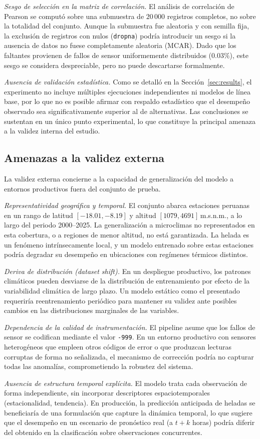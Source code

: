 \emph{Sesgo de selección en la matriz de correlación.} El análisis de correlación
de Pearson se computó sobre una submuestra de $20\,000$ registros completos, no
sobre la totalidad del conjunto. Aunque la submuestra fue aleatoria y con semilla
fija, la exclusión de registros con nulos (\texttt{dropna}) podría introducir un
sesgo si la ausencia de datos no fuese completamente aleatoria (MCAR). Dado que
los faltantes provienen de fallos de sensor uniformemente distribuidos
($0.03\%$), este sesgo se considera despreciable, pero no puede descartarse
formalmente.

\emph{Ausencia de validación estadística.} Como se detalló en la
Sección~\ref{sec:results}, el experimento no incluye múltiples ejecuciones
independientes ni modelos de línea base, por lo que no es posible afirmar con
respaldo estadístico que el desempeño observado sea significativamente superior al
de alternativas. Las conclusiones se sustentan en un único punto experimental, lo
que constituye la principal amenaza a la validez interna del estudio.

\subsection{Amenazas a la validez externa}
La validez externa concierne a la capacidad de generalización del modelo a
entornos productivos fuera del conjunto de prueba.

\emph{Representatividad geográfica y temporal.} El conjunto abarca estaciones
peruanas en un rango de latitud $[-18.01, -8.19]$ y altitud
$[1079, 4691]$\,m.s.n.m., a lo largo del periodo 2000--2025. La generalización a
microclimas no representados en esta cobertura, o a regiones de menor altitud, no
está garantizada. La helada es un fenómeno intrínsecamente local, y un modelo
entrenado sobre estas estaciones podría degradar su desempeño en ubicaciones con
regímenes térmicos distintos.

\emph{Deriva de distribución (\emph{dataset shift}).} En un despliegue productivo,
los patrones climáticos pueden desviarse de la distribución de entrenamiento por
efecto de la variabilidad climática de largo plazo. Un modelo estático como el
presentado requeriría reentrenamiento periódico para mantener su validez ante
posibles cambios en las distribuciones marginales de las variables.

\emph{Dependencia de la calidad de instrumentación.} El pipeline asume que los
fallos de sensor se codifican mediante el valor \texttt{-999}. En un entorno
productivo con sensores heterogéneos que empleen otros códigos de error o que
produzcan lecturas corruptas de forma no señalizada, el mecanismo de corrección
podría no capturar todas las anomalías, comprometiendo la robustez del sistema.

\emph{Ausencia de estructura temporal explícita.} El modelo trata cada
observación de forma independiente, sin incorporar descriptores espaciotemporales
(estacionalidad, tendencia). En producción, la predicción anticipada de heladas
se beneficiaría de una formulación que capture la dinámica temporal, lo que
sugiere que el desempeño en un escenario de pronóstico real (a $t+k$ horas) podría
diferir del obtenido en la clasificación sobre observaciones concurrentes.